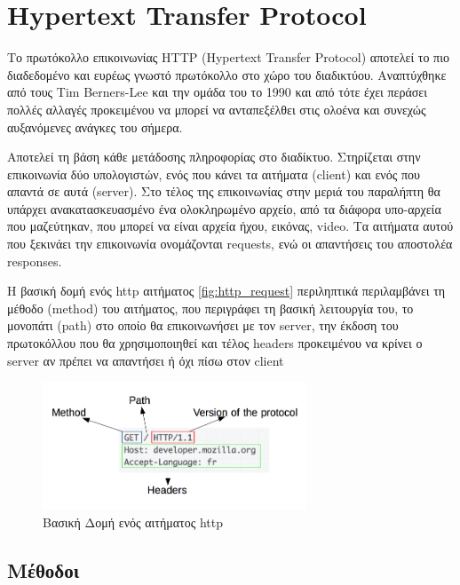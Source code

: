 \section{Hypertext Transfer Protocol}
\label{section:http}

Το πρωτόκολλο επικοινωνίας HTTP (Hypertext Transfer Protocol) αποτελεί το πιο διαδεδομένο και ευρέως γνωστό
πρωτόκολλο στο χώρο του διαδικτύου. Αναπτύχθηκε από τους Tim Berners-Lee και την ομάδα του το 1990 και από τότε
έχει περάσει πολλές αλλαγές προκειμένου να μπορεί να ανταπεξέλθει στις ολοένα και συνεχώς αυξανόμενες ανάγκες του σήμερα.

Αποτελεί τη βάση κάθε μετάδοσης πληροφορίας στο διαδίκτυο. Στηρίζεται στην επικοινωνία δύο υπολογιστών, ενός που κάνει τα αιτήματα (client)
και ενός που απαντά σε αυτά (server). Στο τέλος της επικοινωνίας στην μεριά του παραλήπτη θα υπάρχει ανακατασκευασμένο
ένα ολοκληρωμένο αρχείο, από τα διάφορα υπο-αρχεία που μαζεύτηκαν, που μπορεί να είναι αρχεία ήχου, εικόνας, video.
Τα αιτήματα αυτού που ξεκινάει την επικοινωνία ονομάζονται requests, ενώ οι απαντήσεις του αποστολέα responses.

Η βασική δομή ενός http αιτήματος \autoref{fig:http_request} περιληπτικά περιλαμβάνει τη μέθοδο (method) του αιτήματος, που περιγράφει
τη βασική λειτουργία του, το μονοπάτι (path) στο οποίο θα επικοινωνήσει με τον server, την έκδοση του πρωτοκόλλου που 
θα χρησιμοποιηθεί και τέλος headers προκειμένου να κρίνει ο server αν πρέπει να απαντήσει ή όχι πίσω στον client

\begin{figure}[!ht]
	\centering
	\includegraphics[width=0.7\textwidth]{./images/chapter2/http_request.png}
	\caption[Βασική Δομή ενός αιτήματος http]{Βασική Δομή ενός αιτήματος http}
	\label{fig:http_request}
\end{figure}

\subsection{Μέθοδοι}
\label{subsec:http_methods}

